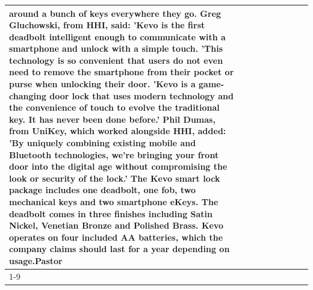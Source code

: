\begin{table}[H]
\begin{tabular}{lllrlllll}
around a bunch of keys everywhere they go. Greg Gluchowski, from HHI, said: 'Kevo is the first deadbolt intelligent enough to communicate with a smartphone and unlock with a simple touch. 'This technology is so convenient that users do not even need to remove the smartphone from their pocket or purse when unlocking their door. 'Kevo is a game-changing door lock that uses modern technology and the convenience of touch to evolve the traditional key. It has never been done before.' Phil Dumas, from UniKey, which worked alongside HHI, added: 'By uniquely combining existing mobile and Bluetooth technologies, we’re bringing your front door into the digital age without compromising the look or security of the lock.' The Kevo smart lock package includes one deadbolt, one fob, two mechanical keys and two smartphone eKeys. The deadbolt comes in three finishes including Satin Nickel, Venetian Bronze and Polished Brass. Kevo operates on four included AA batteries, which the company claims should last for a year depending on usage.Pastor \\
\cline{1-9}

\end{tabular}
\end{table}
